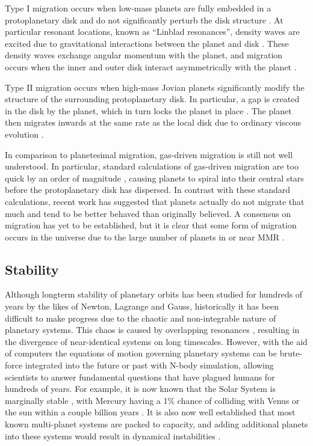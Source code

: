 \documentclass[12pt,letter]{aastex}
\begin{document}
Type I migration occurs when low-mass planets are fully embedded in a protoplanetary disk and do not significantly perturb the disk structure \citep{Armitage2010}. 
At particular resonant locations, known as ``Linblad resonances'', density waves are excited due to gravitational interactions between the planet and disk \citep{Goldreich1979}. 
These density waves exchange angular momentum with the planet, and migration occurs when the inner and outer disk interact asymmetrically with the planet \citep{Goldreich1979}.

Type II migration occurs when high-mass Jovian planets significantly modify the structure of the surrounding protoplanetary disk. 
In particular, a gap is created in the disk by the planet, which in turn locks the planet in place \citep{Armitage2010}.
The planet then migrates inwards at the same rate as the local disk due to ordinary viscous evolution \citep{Armitage2010}.  

In comparison to planetesimal migration, gas-driven migration is still not well understood. 
In particular, standard calculations of gas-driven migration are too quick by an order of magnitude \citep{Lin1986, Tanaka2002}, causing planets to spiral into their central stars before the protoplanetary disk has dispersed.
In contrast with these standard calculations, recent work \citep{Fung2017} has suggested that planets actually do not migrate that much and tend to be better behaved than originally believed. 
A consensus on migration has yet to be established, but it is clear that some form of migration occurs in the universe due to the large number of planets in or near MMR \citep{Lissauer2011,Fabrycky2014,Steffen2015}.

\subsection{Stability}
Although longterm stability of planetary orbits has been studied for hundreds of years by the likes of Newton, Lagrange and Gauss, historically it has been difficult to make progress due to the chaotic and non-integrable nature of planetary systems.  
This chaos is caused by overlapping resonances \citep{Chirikov1979, Lecar2001}, resulting in the divergence of near-identical systems on long timescales. 
However, with the aid of computers the equations of motion governing planetary systems can be brute-force integrated into the future or past with N-body simulation, allowing scientists to answer fundamental questions that have plagued humans for hundreds of years. 
For example, it is now known that the Solar System is marginally stable \citep{Sussman1988, Laskar1994, Lecar2001}, with Mercury having a 1\% chance of colliding with Venus or the sun within a couple billion years \citep{Laskar2009}.
It is also now well established that most known multi-planet systems are packed to capacity, and adding additional planets into these systems would result in dynamical instabilities \citep{Fang2013,Pu2015}.
\end{document}
